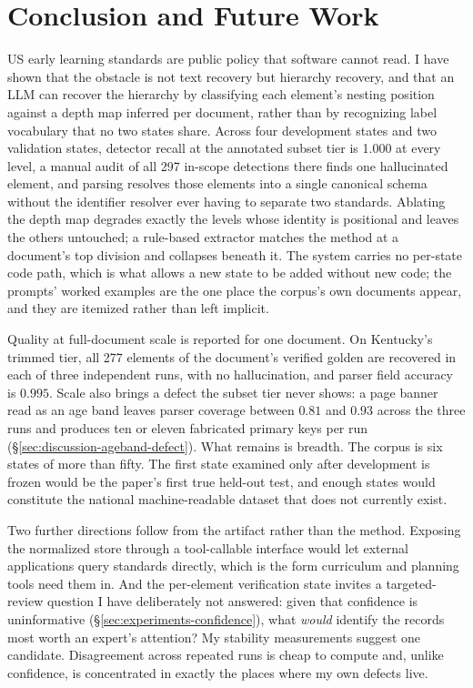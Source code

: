 \section{Conclusion and Future Work}
\label{sec:conclusion}

US early learning standards are public policy that software cannot read. I have
shown that the obstacle is not text recovery but hierarchy recovery, and that an
LLM can recover the hierarchy by classifying each element's nesting position
against a depth map inferred per document, rather than by recognizing label
vocabulary that no two states share. Across four development states and two
validation states, detector recall at the annotated subset tier is 1.000 at
every level, a manual audit of all 297 in-scope detections there finds one
hallucinated element, and parsing resolves those
elements into a single canonical schema without the identifier resolver ever
having to separate two standards. Ablating
the depth map degrades exactly the levels whose identity is positional and
leaves the others untouched; a rule-based extractor matches the method at a
document's top division and collapses beneath it. The system carries no
per-state code path, which is what allows a new state to be added without new
code; the prompts' worked examples are the one place the corpus's own documents
appear, and they are itemized rather than left implicit.

Quality at full-document scale is reported for one document. On Kentucky's
trimmed tier, all 277 elements of the document's verified golden are recovered
in each of three independent runs, with no hallucination, and parser field
accuracy is $0.995$. Scale also brings a defect the subset tier never shows: a
page banner read as an age band leaves parser coverage between $0.81$ and
$0.93$ across the three runs and produces ten or eleven fabricated primary keys
per run (\S\ref{sec:discussion-ageband-defect}). What remains is breadth. The
corpus is six states of more than fifty. The first state examined only after
development is frozen would be the paper's first true held-out test, and enough
states would constitute the national machine-readable dataset that does not
currently exist.

Two further directions follow from the artifact rather than the method.
Exposing the normalized store through a tool-callable interface would let
external applications query standards directly, which is the form curriculum
and planning tools need them in. And the per-element verification state invites
a targeted-review question I have deliberately not answered: given that
confidence is uninformative (\S\ref{sec:experiments-confidence}), what
\emph{would} identify the records most worth an expert's attention? My
stability measurements suggest one candidate. Disagreement across repeated
runs is cheap to compute and, unlike confidence, is concentrated in exactly the
places where my own defects live.
